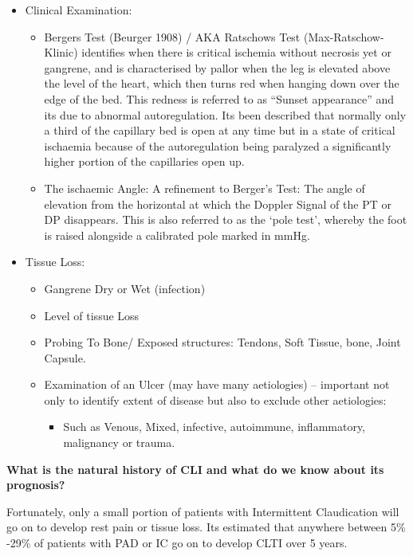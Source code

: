 \documentclass[
]{book}
\providecommand{\tightlist}{%
  \setlength{\itemsep}{0pt}\setlength{\parskip}{0pt}}
\begin{document}
\begin{itemize}
\item
  Clinical Examination:

  \begin{itemize}
  \item
    Bergers Test (Beurger 1908) / AKA Ratschows Test
    (Max-Ratschow-Klinic) identifies when there is critical ischemia
    without necrosis yet or gangrene, and is characterised by pallor
    when the leg is elevated above the level of the heart, which
    then turns red when hanging down over the edge of the bed. This
    redness is referred to as ``Sunset appearance'' and its due to
    abnormal autoregulation. Its been described that normally only a
    third of the capillary bed is open at any time but in a state of
    critical ischaemia because of the autoregulation being paralyzed
    a significantly higher portion of the capillaries open up.
  \item
    The ischaemic Angle: A refinement to Berger's Test: The angle of
    elevation from the horizontal at which the Doppler Signal of the
    PT or DP disappears. This is also referred to as the `pole
    test', whereby the foot is raised alongside a calibrated pole
    marked in mmHg.
  \end{itemize}
\item
  Tissue Loss:

  \begin{itemize}
  \item
    Gangrene Dry or Wet (infection)
  \item
    Level of tissue Loss
  \item
    Probing To Bone/ Exposed structures: Tendons, Soft Tissue, bone,
    Joint Capsule.
  \item
    Examination of an Ulcer (may have many aetiologies) -- important
    not only to identify extent of disease but also to exclude other
    aetiologies:

    \begin{itemize}
    \tightlist
    \item
      Such as Venous, Mixed, infective, autoimmune, inflammatory,
      malignancy or trauma.
    \end{itemize}
  \end{itemize}
\end{itemize}

\textbf{What is the natural history of CLI and what do we know about its
prognosis?}

Fortunately, only a small portion of patients with Intermittent
Claudication will go on to develop rest pain or tissue loss. Its
estimated that anywhere between 5\% -29\% of patients with PAD or IC go on
to develop CLTI over 5 years.
\end{document}
